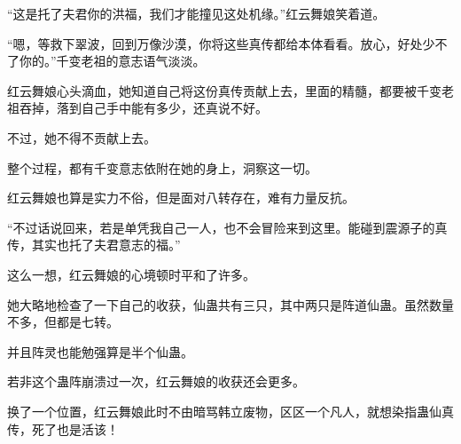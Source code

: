 \begin{this_body}
“这是托了夫君你的洪福，我们才能撞见这处机缘。”红云舞娘笑着道。

“嗯，等救下翠波，回到万像沙漠，你将这些真传都给本体看看。放心，好处少不了你的。”千变老祖的意志语气淡淡。

红云舞娘心头滴血，她知道自己将这份真传贡献上去，里面的精髓，都要被千变老祖吞掉，落到自己手中能有多少，还真说不好。

不过，她不得不贡献上去。

整个过程，都有千变意志依附在她的身上，洞察这一切。

红云舞娘也算是实力不俗，但是面对八转存在，难有力量反抗。

“不过话说回来，若是单凭我自己一人，也不会冒险来到这里。能碰到震源子的真传，其实也托了夫君意志的福。”

这么一想，红云舞娘的心境顿时平和了许多。

她大略地检查了一下自己的收获，仙蛊共有三只，其中两只是阵道仙蛊。虽然数量不多，但都是七转。

并且阵灵也能勉强算是半个仙蛊。

若非这个蛊阵崩溃过一次，红云舞娘的收获还会更多。

换了一个位置，红云舞娘此时不由暗骂韩立废物，区区一个凡人，就想染指蛊仙真传，死了也是活该！

\end{this_body}

